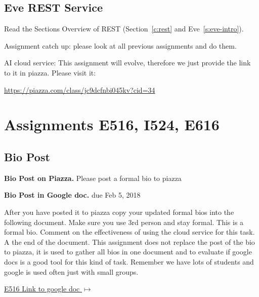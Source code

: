 \subsection{Eve REST Service}
\label{E:rest-eve}
\begin{exercise}
Read the Sections Overview of REST (Section~\ref{c:rest} and Eve~\ref{s:eve-intro}).
\end{exercise}

\begin{exercise}
Assignment catch up: please look at all previous assignments and do
them. 
\end{exercise}

\begin{exercise}

AI cloud service: This assignment will evolve, therefore we just
provide the link to it in piazza. Please visit it:

\url{https://piazza.com/class/jc9dcfnbi045kv?cid=34}
\end{exercise}

\section{Assignments E516, I524, E616}
\label{s:616-assignments}

\subsection{Bio Post}\label{a:616-bio}

\begin{exercise}\label{E:616-bio-piazza}
{\bf Bio Post on Piazza.} Please post a formal bio to piazza
\end{exercise}

\begin{exercise}\label{E:616-bio-googledocs}

  {\bf Bio Post in Google doc.} due Feb 5, 2018
  
  After you have posted it to piazza
  copy your updated formal bios into the following document.  Make
  sure you use 3rd person and stay formal. This is a formal
  bio. Comment on the effectiveness of using the cloud service for
  this task. A the end of the document. This assignment does not
  replace the post of the bio to piazza, it is used to gather all bios
  in one document and to evaluate if google docs is a good tool for
  this kind of task. Remember we have lots of students and google is
  used often just with small groups.
 
 \smallskip

 {\hfill
   \href{https://docs.google.com/document/d/1ejzlKYqC3dLac8WXVpcPQsJh1j4BDqRxxgGg1cFQbeQ/edit?usp=sharing}{E516
     Link to google doc $\mapsto$}}


 \end{exercise}

